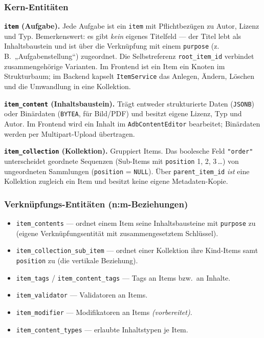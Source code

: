 \documentclass[11pt,a4paper]{article}
\begin{document}
\subsubsection{Kern-Entitäten}
\textbf{\texttt{item} (Aufgabe).} Jede Aufgabe ist ein \texttt{item} mit
Pflichtbezügen zu Autor, Lizenz und Typ. Bemerkenswert: es gibt \emph{kein}
eigenes Titelfeld --- der Titel lebt als Inhaltsbaustein und ist über die
Verknüpfung mit einem \texttt{purpose} (z.\,B.\ „Aufgabenstellung``) zugeordnet.
Die Selbstreferenz \texttt{root\_item\_id} verbindet zusammengehörige Varianten.
Im Frontend ist ein Item ein Knoten im Strukturbaum; im Backend kapselt
\texttt{ItemService} das Anlegen, Ändern, Löschen und die Umwandlung in eine
Kollektion.

\textbf{\texttt{item\_content} (Inhaltsbaustein).} Trägt entweder strukturierte
Daten (\texttt{JSONB}) oder Binärdaten (\texttt{BYTEA}, für Bild/PDF) und besitzt
eigene Lizenz, Typ und Autor. Im Frontend wird ein Inhalt im
\texttt{AdbContentEditor} bearbeitet; Binärdaten werden per Multipart-Upload
übertragen.

\textbf{\texttt{item\_collection} (Kollektion).} Gruppiert Items. Das boolesche
Feld \texttt{"order"} unterscheidet geordnete Sequenzen (Sub-Items mit
\texttt{position} 1, 2, 3\,\ldots) von ungeordneten Sammlungen (\texttt{position}
= \texttt{NULL}). Über \texttt{parent\_item\_id} \emph{ist} eine Kollektion
zugleich ein Item und besitzt keine eigene Metadaten-Kopie.

\subsubsection{Verknüpfungs-Entitäten (n:m-Beziehungen)}
\begin{itemize}
  \item \texttt{item\_contents} --- ordnet einem Item seine Inhaltsbausteine mit
  \texttt{purpose} zu (eigene Verknüpfungsentität mit zusammengesetztem Schlüssel).
  \item \texttt{item\_collection\_sub\_item} --- ordnet einer Kollektion ihre
  Kind-Items samt \texttt{position} zu (die vertikale Beziehung).
  \item \texttt{item\_tags} / \texttt{item\_content\_tags} --- Tags an Items bzw.\
  an Inhalte.
  \item \texttt{item\_validator} --- Validatoren an Items.
  \item \texttt{item\_modifier} --- Modifikatoren an Items \emph{(vorbereitet)}.
  \item \texttt{item\_content\_types} --- erlaubte Inhaltstypen je Item.
\end{itemize}
\end{document}
